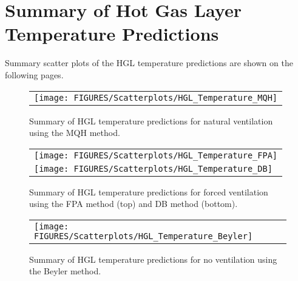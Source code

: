 \clearpage


\section{Summary of Hot Gas Layer Temperature Predictions}

Summary scatter plots of the HGL temperature predictions are shown on the following pages.

\begin{figure}[ht]
\begin{center}
\begin{tabular}{l}
\texttt{[image: FIGURES/Scatterplots/HGL\_Temperature\_MQH]}
\end{tabular}
\end{center}
\caption[Summary of HGL temperature predictions for natural ventilation.]
{Summary of HGL temperature predictions for natural ventilation using the MQH method.}
\label{HGL_Summary_Natural_Ventilation}
\end{figure}

\begin{figure}[p]
\begin{center}
\begin{tabular}{l}
\texttt{[image: FIGURES/Scatterplots/HGL\_Temperature\_FPA]} \\
\texttt{[image: FIGURES/Scatterplots/HGL\_Temperature\_DB]}
\end{tabular}
\end{center}
\caption[Summary of HGL temperature predictions for forced ventilation.]
{Summary of HGL temperature predictions for forced ventilation using the FPA method (top) and DB method (bottom).}
\label{HGL_Summary_Forced_Ventilation}
\end{figure}

\begin{figure}[p]
\begin{center}
\begin{tabular}{l}
\texttt{[image: FIGURES/Scatterplots/HGL\_Temperature\_Beyler]}
\end{tabular}
\end{center}
\caption[Summary of HGL temperature predictions for no ventilation.]
{Summary of HGL temperature predictions for no ventilation using the Beyler method.}
\label{HGL_Summary_No_Ventilation}
\end{figure}

